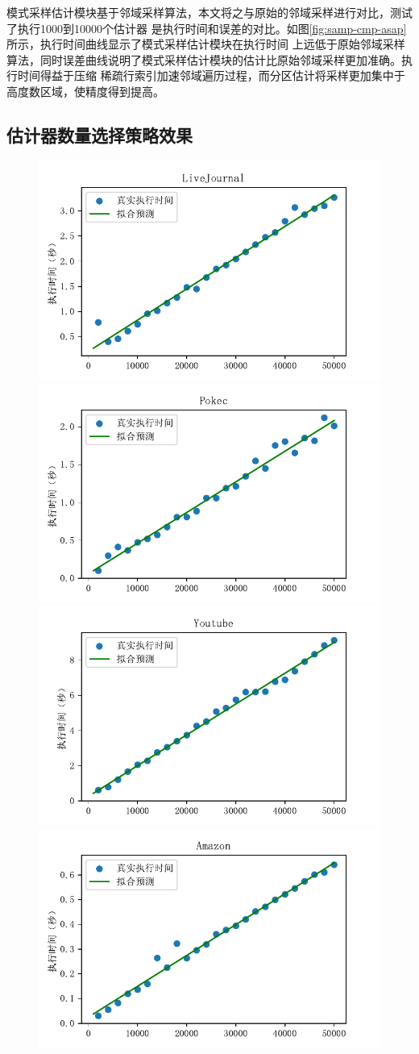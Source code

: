 \documentclass[master]{thesis-uestc}
\begin{document}
    模式采样估计模块基于邻域采样算法，本文将之与原始的邻域采样进行对比，测试了执行1000到10000个估计器
是执行时间和误差的对比。如图\ref{fig:samp-cmp-asap}所示，执行时间曲线显示了模式采样估计模块在执行时间
上远低于原始邻域采样算法，同时误差曲线说明了模式采样估计模块的估计比原始邻域采样更加准确。执行时间得益于压缩
稀疏行索引加速邻域遍历过程，而分区估计将采样更加集中于高度数区域，使精度得到提高。

\subsection{估计器数量选择策略效果}
\label{subsec:elp-exp}

\begin{figure}
    \includegraphics[width=0.5\linewidth]{pic/tn/LiveJournal.pdf}%
    \includegraphics[width=0.5\linewidth]{pic/tn/Pokec.pdf}\\
    \includegraphics[width=0.5\linewidth]{pic/tn/Youtube.pdf}%
    \includegraphics[width=0.5\linewidth]{pic/tn/Amazon.pdf}\\

\end{figure}
\end{document}
